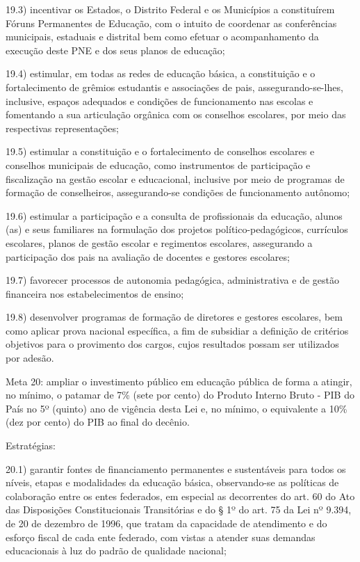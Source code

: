 \documentclass[
]{book}
\begin{document}
19.3) incentivar os Estados, o Distrito Federal e os Municípios a constituírem Fóruns Permanentes de Educação, com o intuito de coordenar as conferências municipais, estaduais e distrital bem como efetuar o acompanhamento da execução deste PNE e dos seus planos de educação;

19.4) estimular, em todas as redes de educação básica, a constituição e o fortalecimento de grêmios estudantis e associações de pais, assegurando-se-lhes, inclusive, espaços adequados e condições de funcionamento nas escolas e fomentando a sua articulação orgânica com os conselhos escolares, por meio das respectivas representações;

19.5) estimular a constituição e o fortalecimento de conselhos escolares e conselhos municipais de educação, como instrumentos de participação e fiscalização na gestão escolar e educacional, inclusive por meio de programas de formação de conselheiros, assegurando-se condições de funcionamento autônomo;

19.6) estimular a participação e a consulta de profissionais da educação, alunos (as) e seus familiares na formulação dos projetos político-pedagógicos, currículos escolares, planos de gestão escolar e regimentos escolares, assegurando a participação dos pais na avaliação de docentes e gestores escolares;

19.7) favorecer processos de autonomia pedagógica, administrativa e de gestão financeira nos estabelecimentos de ensino;

19.8) desenvolver programas de formação de diretores e gestores escolares, bem como aplicar prova nacional específica, a fim de subsidiar a definição de critérios objetivos para o provimento dos cargos, cujos resultados possam ser utilizados por adesão.

Meta 20: ampliar o investimento público em educação pública de forma a atingir, no mínimo, o patamar de 7\% (sete por cento) do Produto Interno Bruto - PIB do País no 5º (quinto) ano de vigência desta Lei e, no mínimo, o equivalente a 10\% (dez por cento) do PIB ao final do decênio.

Estratégias:

20.1) garantir fontes de financiamento permanentes e sustentáveis para todos os níveis, etapas e modalidades da educação básica, observando-se as políticas de colaboração entre os entes federados, em especial as decorrentes do art. 60 do Ato das Disposições Constitucionais Transitórias e do § 1º do art. 75 da Lei nº 9.394, de 20 de dezembro de 1996, que tratam da capacidade de atendimento e do esforço fiscal de cada ente federado, com vistas a atender suas demandas educacionais à luz do padrão de qualidade nacional;
\end{document}
